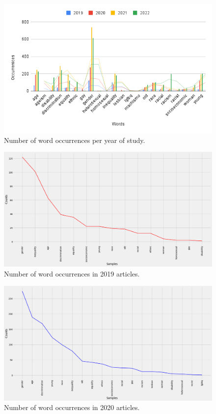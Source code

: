 \documentclass[runningheads]{llncs}
\begin{document}
\begin{figure}
\includegraphics[width=\textwidth]{chart.png}
\centering
\caption{Number of word occurrences per year of study.} \label{fig:general_chart}
\end{figure}
\begin{figure}
\includegraphics[width=\textwidth]{2019.png}
\centering
\caption{Number of word occurrences in 2019 articles.} \label{fig:2019}
\end{figure}
\begin{figure}
\includegraphics[width=\textwidth]{2020.png}
\centering
\caption{Number of word occurrences in 2020 articles.} \label{fig:2020}
\end{figure}
\end{document}
